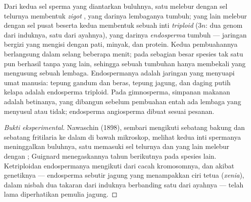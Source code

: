 \begin{proposition}\label{prop:b2:angiosperm-reproduction:double}
Dari kedua sel sperma yang diantarkan buluhnya, satu melebur dengan sel
telurnya membentuk \emph{zigot} , yang darinya lembaganya
tumbuh; yang lain melebur dengan sel pusat beserta kedua 
membentuk sebuah inti \emph{triploid} ($3n$: dua genom dari induknya,
satu dari ayahnya), yang darinya \emph{endosperma} tumbuh --- jaringan
bergizi yang mengisi  dengan pati, minyak, dan protein. Kedua
pembuahannya berlangsung dalam selang beberapa menit; pada sebagian
besar spesies tak satu pun berhasil tanpa yang lain, sehingga sebuah
tumbuhan hanya membekali  yang mengusung sebuah lembaga.
Endospermanya adalah jaringan yang menyuapi umat manusia: tepung gandum
dan beras, tepung jagung, dan daging putih kelapa adalah endosperma
triploid. Pada gimnosperma, simpanan makanan  adalah 
betinanya, yang dibangun sebelum pembuahan entah ada lembaga yang
menyusul atau tidak; endosperma angiosperma dibuat sesuai pesanan.
\end{proposition}
\begin{proof}[Bukti eksperimental]
Nawaschin (1898), sembari mengikuti  sebatang bakung
dan sebatang fritilaria ke dalam  di bawah mikroskop,
melihat kedua inti spermanya meninggalkan buluhnya, satu memasuki sel
telurnya dan yang lain melebur dengan ; Guignard
menegaskannya tahun berikutnya pada spesies lain. Ketriploidan
endospermanya mengikuti dari cacah kromosomnya, dan akibat genetiknya
--- endosperma sebutir  jagung yang menampakkan ciri tetua  (\emph{xenia}), dalam nisbah dua takaran dari induknya
berbanding satu dari ayahnya --- telah lama diperhatikan pemulia jagung.
\end{proof}

